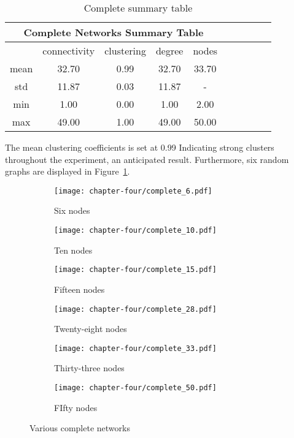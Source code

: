 \begin{table}[!hbtp]
	\centering
	\begin{adjustbox}{width=0.5\textwidth}
		\small
		\begin{tabular}{cccccccccc}
				\toprule
			\multicolumn{5}{|c|}{Complete Networks Summary Table}                     \\ \hline
			     & connectivity & clustering & degree & nodes                  \\ \hline
			mean & 32.70        & 0.99       & 32.70  & 33.70                  \\ \hline
			std  & 11.87        & 0.03       & 11.87  & \multicolumn{1}{c}{-} \\ \hline
			min  & 1.00         & 0.00       & 1.00   & 2.00                   \\ \hline
			max  & 49.00        & 1.00       & 49.00  & 50.00                  \\ \bottomrule
		\end{tabular}
	\end{adjustbox}
	\caption{Complete summary table}
	\label{table:complete-summary-table}
\end{table}

The mean clustering coefficients is set at 0.99 Indicating strong clusters
throughout the experiment, an anticipated result. Furthermore, six random
graphs are displayed in Figure~\ref{complete_networks_illustration}.

\begin{figure}[!hbtp]
	\centering
	\begin{subfigure}[t]{0.30\textwidth}
		\centering
		\texttt{[image: chapter-four/complete\_6.pdf]}
		\caption{Six nodes}
	\end{subfigure}
	\hfill
	\begin{subfigure}[t]{0.30\textwidth}\centering
		\centering
		\texttt{[image: chapter-four/complete\_10.pdf]}
		\caption{Ten nodes}
	\end{subfigure}
	\hfill
	\begin{subfigure}[t]{0.30\textwidth}\centering
		\centering
		\texttt{[image: chapter-four/complete\_15.pdf]}
		\caption{Fifteen nodes}
	\end{subfigure}
	\hfill
	\begin{subfigure}[t]{0.30\textwidth}\centering
		\centering
		\texttt{[image: chapter-four/complete\_28.pdf]}
		\caption{Twenty-eight nodes}
	\end{subfigure}
	\hfill
	\begin{subfigure}[t]{0.30\textwidth}\centering
		\centering
		\texttt{[image: chapter-four/complete\_33.pdf]}
		\caption{Thirty-three nodes}
	\end{subfigure}
	\hfill
	\begin{subfigure}[t]{0.30\textwidth}\centering
		\centering
		\texttt{[image: chapter-four/complete\_50.pdf]}
		\caption{FIfty nodes}
	\end{subfigure}
	\caption{Various complete networks}
	\label{complete_networks_illustration}
\end{figure}

